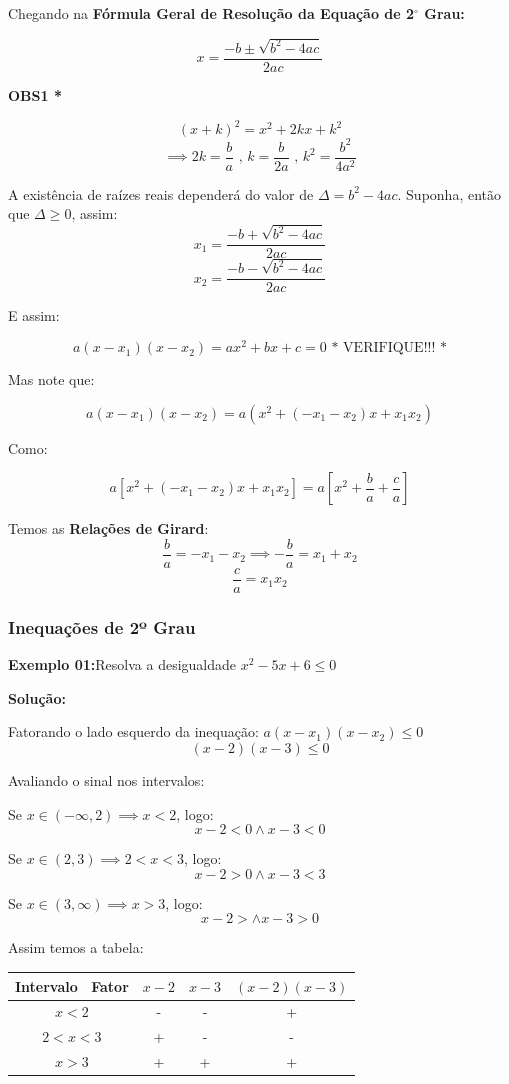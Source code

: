\documentclass[oneside,a4paper,12pt]{article}
\begin{document}
Chegando na {\bf Fórmula Geral de Resolução da Equação de 2$^\circ$ Grau:}

\begin{equation}
x = \displaystyle \frac{-b \pm \displaystyle \sqrt{b^2 - 4ac}}{2ac}
\end{equation}

{\bf * OBS1 *}

$$(x+k)^2 = x^2 + 2kx + k^2$$
$$\implies 2k = \displaystyle \frac{b}{a} \text{ , } k = \displaystyle \frac{b}{2a} \text{ , } k^2 = \displaystyle \frac{b^2}{4a^2}$$

A existência de raízes reais dependerá do valor de $\Delta = b^2 - 4ac$. Suponha, então que $\Delta \geq 0 $, assim:
$$x_1 = \displaystyle \frac{-b + \displaystyle \sqrt{b^2 - 4ac}}{2ac}$$
$$x_2 = \displaystyle \frac{-b - \displaystyle \sqrt{b^2 - 4ac}}{2ac}$$

E assim:

$$ a(x - x_1)(x - x_2)  = ax^2 +bx + c = 0 \text{ * VERIFIQUE!!! *} $$

Mas note que:

$$a(x - x_1)(x - x_2) = a(x^2 + (-x_1 - x_2)x + x_1 x_2)$$

Como:

$$a\left[x^2 + (-x_1-x_2)x + x_1 x_2 \right] = a\left[ x^2 + \frac{b}{a} + \frac{c}{a} \right]$$

Temos as {\bf Relações de Girard}:
$$\displaystyle \frac{b}{a} = -x_1 - x_2 \implies - \displaystyle \frac{b}{a} = x_1 + x_2$$
$$\displaystyle \frac{c}{a} = x_1 x_2$$


\subsubsection{Inequações de 2º Grau}

\textbf{Exemplo 01:}Resolva a desigualdade $x^{2} - 5x + 6 \leq 0$

{\bf Solução:}

Fatorando o lado esquerdo da inequação: $a(x-x_1)(x-x_2) \leq 0$ 
$$(x-2)(x-3) \leq 0$$

Avaliando o sinal nos intervalos:

Se $x \in (-\infty,2) \implies x < 2$, logo:
$$x-2<0 \land x-3 < 0 $$

Se $x \in (2,3) \implies 2<x<3$, logo:
$$x-2 > 0 \land x-3 < 3$$

Se $x \in (3, \infty) \implies x > 3$, logo:
$$x - 2 > \land x - 3>0$$

Assim temos a tabela:
\begin{table}[h]
	\centering
	\begin{tabular}{|c|c|c|c|}
		\hline
		Intervalo \ Fator	&	$x-2$	&	$x-3$	&	$(x-2)(x-3)$ \\
		\hline
		$x<2$				&	-		&	-		&	+	\\
		\hline
		$2<x<3$				&	+		&	-		&	-	\\
		\hline
		$x>3$				&	+		&	+		&	+	\\
		\hline
	\end{tabular}
\end{table}
	
\end{document}
